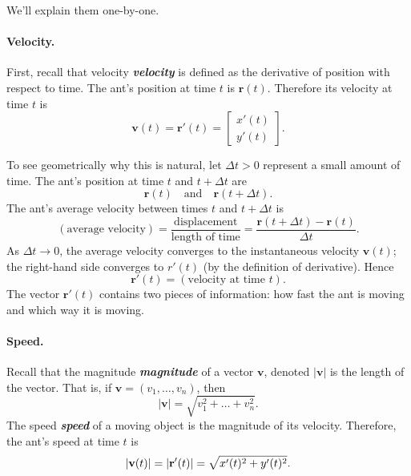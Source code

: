 \documentclass[10pt]{article}
\DeclareRobustCommand{\demph}[1]{%
  \ifmmode
  {\color{Blue}#1}%
  \else
  {\color{Blue}\bfseries\slshape #1}%
  \fi
}
\theoremstyle{definition}
\newcommand{\1}[1]{\textbf{1}_{\left[#1\right]}} %
\begin{document}
We'll explain them one-by-one.

\paragraph{Velocity.} First, recall that \demph{velocity} is defined as the
derivative of position with respect to time. The ant's position at time $t$
is $\mathbf{r}(t)$. Therefore its velocity at time $t$ is
\begin{equation}\label{eq:ants-velocity}
  \mathbf{v}(t) = \mathbf{r}'(t) =
  \begin{bmatrix}
    x'(t)\\
    y'(t)
  \end{bmatrix}.
\end{equation}

To see geometrically why this is natural, let $\Delta t>0$ represent a small
amount of time. The ant's position at time $t$ and $t+\Delta t$ are
\begin{equation*}
  \mathbf{r}(t) \quad \text{and} \quad \mathbf{r}(t+\Delta t).
\end{equation*}
The ant's average velocity between times
$t$ and $t+\Delta t$ is
\begin{equation*}
  (\text{average velocity}) = \frac{\text{displacement}}{\text{length of time}}
  =
  \frac{\mathbf r(t+\Delta t)-\mathbf r(t)}{\Delta t}.
\end{equation*}
As $\Delta t\to0$, the average velocity converges to the instantaneous
velocity $\mathbf{v}(t)$; the right-hand side converges to $r'(t)$ (by the
definition of derivative). Hence
\begin{equation*}
  \mathbf{r}'(t) = (\text{velocity at time }t).
\end{equation*}
The vector $\mathbf{r}'(t)$ contains two pieces of information: how fast the ant is
moving and which way it is moving.


\paragraph{Speed.}
Recall that the \demph{magnitude} of a vector $\mathbf{v}$, denoted $|\mathbf{v}|$ is the
length of the vector. That is, if $\mathbf{v}=(v_{1},\ldots,v_{n})$, then
\begin{equation*}
  |\mathbf{v}| = \sqrt{v_{1}^{2}+\ldots+v_{n}^{2}}.
\end{equation*}
The \demph{speed} of a moving object is the magnitude
of its velocity. Therefore, the ant's speed at time $t$ is
\begin{equation*}
  \left| \mathbf v(t) \right|
  =|\mathbf r'(t)|\\
  =\sqrt{x'(t)^2+y'(t)^2}.
\end{equation*}
\end{document}
